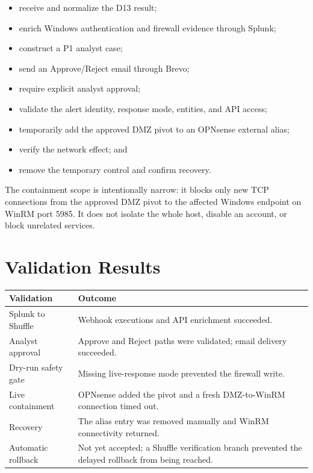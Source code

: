 \documentclass[11pt,a4paper]{article}
\begin{document}
\begin{itemize}
  \item receive and normalize the D13 result;
  \item enrich Windows authentication and firewall evidence through Splunk;
  \item construct a P1 analyst case;
  \item send an Approve/Reject email through Brevo;
  \item require explicit analyst approval;
  \item validate the alert identity, response mode, entities, and API access;
  \item temporarily add the approved DMZ pivot to an OPNsense external alias;
  \item verify the network effect; and
  \item remove the temporary control and confirm recovery.
\end{itemize}

The containment scope is intentionally narrow: it blocks only new TCP
connections from the approved DMZ pivot to the affected Windows endpoint on
WinRM port 5985. It does not isolate the whole host, disable an account, or
block unrelated services.

\section{Validation Results}

\begin{tabularx}{\textwidth}{@{}p{}X@{}}
\toprule
\textbf{Validation} & \textbf{Outcome} \\
\midrule
Splunk to Shuffle & Webhook executions and API enrichment succeeded. \\
Analyst approval & Approve and Reject paths were validated; email delivery succeeded. \\
Dry-run safety gate & Missing live-response mode prevented the firewall write. \\
Live containment & OPNsense added the pivot and a fresh DMZ-to-WinRM connection timed out. \\
Recovery & The alias entry was removed manually and WinRM connectivity returned. \\
Automatic rollback & Not yet accepted; a Shuffle verification branch prevented the delayed rollback from being reached. \\
\bottomrule
\end{tabularx}
\end{document}
